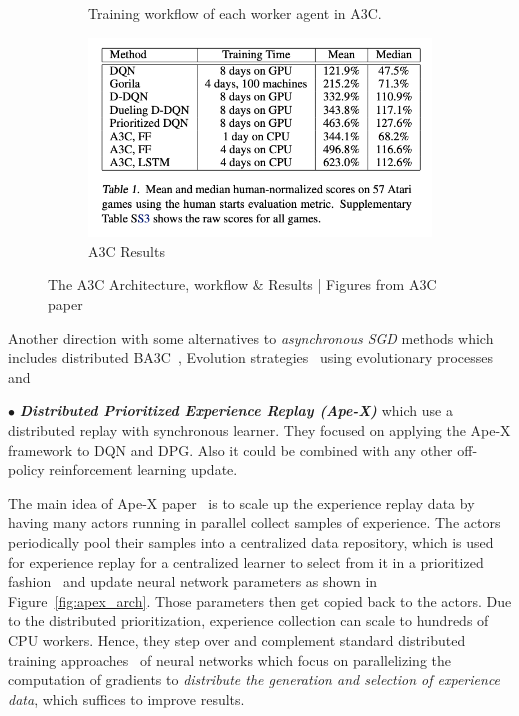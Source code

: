 \begin{figure}[!htb]
\begin{subfigure}[b]{0.33\textwidth}
		\caption{Training workflow of each worker agent in A3C.}
		\label{fig:a3c_workflow}
	\end{subfigure}
	\hfill
	\begin{subfigure}[b]{0.33\textwidth}
		\centering
		\includegraphics[width=\textwidth]{figures/algos/a3c_results.png}
		\caption{A3C Results}
		\label{fig:a3c_results}
	\end{subfigure}
	\hfill
	\caption{The A3C Architecture, workflow \& Results | Figures from A3C paper~\parencite{mnih2016asynchronous}}
	\label{fig:a3c}
\end{figure}

Another direction with some alternatives to \textit{asynchronous SGD} methods which includes distributed BA3C~\parencite{adamski2018distributed}, Evolution strategies~\parencite{salimans2017evolution} using evolutionary processes and 

$\bullet$ \textit{\textbf{Distributed Prioritized Experience Replay (Ape-X)}} which use a distributed replay with synchronous learner. They focused on applying the Ape-X framework to DQN and DPG. Also it could be combined with any other off-policy reinforcement learning update. 

The main idea of Ape-X paper~\parencite{horgan2018distributed} is to scale up the experience replay data by having many actors running in parallel collect samples of experience. The actors periodically pool their samples into a centralized data repository, which is used for experience replay for a centralized learner to select from it in a prioritized fashion~\parencite{schaul2015prioritized} and update neural network parameters as shown in Figure~\ref{fig:apex_arch}. Those parameters then get copied back to the actors. Due to the distributed prioritization, experience collection can scale to hundreds of CPU workers. Hence, they step over and complement standard distributed training approaches~\parencite{dean2012large} of neural networks which focus on parallelizing the computation of gradients to \textit{distribute the generation and selection of experience data}, which suffices to improve results. 

